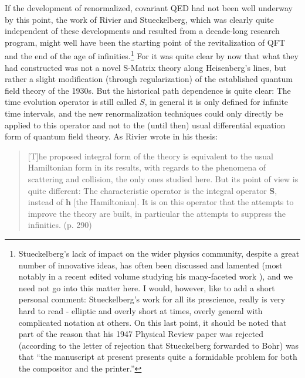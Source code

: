 \documentclass[12pt]{article}
\begin{document}
If the development of renormalized, covariant QED had not been well underway by this point, the work of Rivier and Stueckelberg, which was clearly quite independent of these developments and resulted from a decade-long research program, might well have been the starting point of the revitalization of QFT and the end of the age of infinities.\footnote{Stueckelberg's lack of impact on the wider physics community, despite a great number of innovative ideas, has often been discussed and lamented (most notably in a recent edited volume studying his many-faceted work \citep{lacki_2009_ecg}), and we need not go into this matter here. I would, however, like to add a short personal comment: Stueckelberg's work for all its prescience, really is very hard to read - elliptic and overly short at times, overly general with complicated notation at others. On this last point, it should be noted that part of the reason that his 1947 Physical Review paper was rejected (according to the letter of rejection that Stueckelberg forwarded to Bohr) was that ``the manuscript at present presents quite a formidable problem for both the compositor and the printer.''} For it was quite clear by now that what they had constructed was not a novel S-Matrix theory along Heisenberg's lines, but rather a slight modification (through regularization) of the established quantum field theory of the 1930s. But the historical path dependence is quite clear: The time evolution operator is still called $S$, in general it is only defined for infinite time intervals, and the new renormalization techniques could only directly be applied to this operator and not to the (until then) usual differential equation form of quantum field theory. As Rivier wrote in his thesis:

\begin{quote}
[T]he proposed integral form of the theory is equivalent to the usual Hamiltonian form in its results, with regards to the phenomena of scattering and collision, the only ones studied here.
But its point of view is quite different: The characteristic operator is the integral operator $\mathbf{S}$, instead of $\mathbf{h}$ [the Hamiltonian]. It is on this operator that the attempts to improve the theory are built, in particular the attempts to suppress the infinities. (p. 290)
\end{quote}
\end{document}
